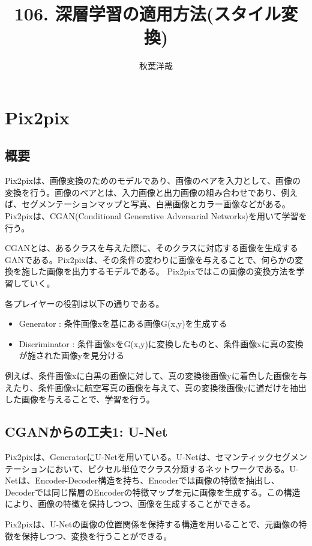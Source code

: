 \documentclass{ltjsarticle}
\begin{document}
\title{106. 深層学習の適用方法(スタイル変換)}
\author{秋葉洋哉}
\maketitle

\section{Pix2pix}
\subsection{概要}
Pix2pixは、画像変換のためのモデルであり、画像のペアを入力として、画像の変換を行う。画像のペアとは、入力画像と出力画像の組み合わせであり、例えば、セグメンテーションマップと写真、白黒画像とカラー画像などがある。Pix2pixは、CGAN(Conditional Generative Adversarial Networks)を用いて学習を行う。
\par
CGANとは、あるクラスを与えた際に、そのクラスに対応する画像を生成するGANである。Pix2pixは、その条件の変わりに画像を与えることで、何らかの変換を施した画像を出力するモデルである。
Pix2pixではこの画像の変換方法を学習していく。
\par
各プレイヤーの役割は以下の通りである。
\begin{itemize}
  \item Generator : 条件画像xを基にある画像G(x,y)を生成する
  \item Discriminator : 条件画像xをG(x,y)に変換したものと、条件画像xに真の変換が施された画像yを見分ける
\end{itemize}
\par
例えば、条件画像xに白黒の画像に対して、真の変換後画像yに着色した画像を与えたり、条件画像xに航空写真の画像を与えて、真の変換後画像yに道だけを抽出した画像を与えることで、学習を行う。

\subsection{CGANからの工夫1: U-Net}
Pix2pixは、GeneratorにU-Netを用いている。U-Netは、セマンティックセグメンテーションにおいて、ピクセル単位でクラス分類するネットワークである。U-Netは、Encoder-Decoder構造を持ち、Encoderでは画像の特徴を抽出し、Decoderでは同じ階層のEncoderの特徴マップを元に画像を生成する。この構造により、画像の特徴を保持しつつ、画像を生成することができる。
\par
Pix2pixは、U-Netの画像の位置関係を保持する構造を用いることで、元画像の特徴を保持しつつ、変換を行うことができる。
\end{document}
